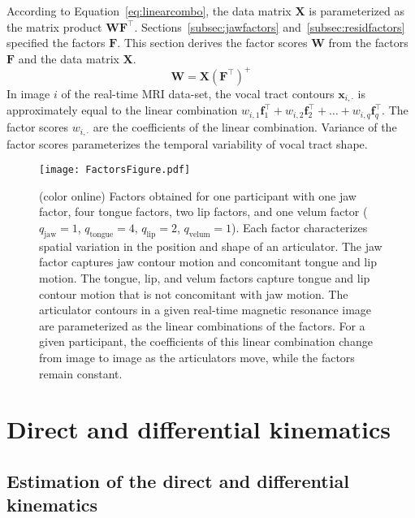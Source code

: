 \documentclass[preprint]{JASAnew}\usepackage[]{graphicx}\usepackage[]{color}
\begin{document}
According to Equation~\ref{eq:linearcombo}, the data matrix $\mathbf{X}$ is parameterized as the matrix product $\mathbf{W}\mathbf{F}^\intercal$. 
%
Sections~\ref{subsec:jawfactors} and~\ref{subsec:residfactors} specified the factors $\mathbf{F}$. 
%
This section derives the factor scores $\mathbf{W}$ from the factors $\mathbf{F}$ and the data matrix $\mathbf{X}$. 
%
\begin{equation}
\mathbf{W} 
 = \mathbf{X} \left( \mathbf{F}^\intercal \right) ^+
\end{equation}
%
In image $i$ of the real-time MRI data-set, the vocal tract contours $\mathbf{x}_{i,\cdot}$ is approximately equal to the linear combination $w_{i,1} \mathbf{f}_1^\intercal + w_{i,2} \mathbf{f}_2^\intercal + \ldots + w_{i,q} \mathbf{f}_q^\intercal$. The factor scores $w_{i,\cdot }$ are the coefficients of the linear combination. Variance of the factor scores parameterizes the temporal variability of vocal tract shape. 

\begin{figure}

\texttt{[image: FactorsFigure.pdf]}

\caption{(color online) Factors obtained for one participant with one jaw factor, four tongue factors, two lip factors, and one velum factor ($q_\text{jaw} = 1$, $q_\text{tongue} = 4$, $q_\text{lip} = 2$, $q_\text{velum} = 1$). 
Each factor characterizes spatial variation in the position and shape of an articulator. 
The jaw factor captures jaw contour motion and concomitant tongue and lip motion.
The tongue, lip, and velum factors capture tongue and lip contour motion that is not concomitant with jaw motion. 
The articulator contours in a given real-time magnetic resonance image are parameterized as the linear combinations of the factors. 
For a given participant, the coefficients of this linear combination change from image to image as the articulators move, while the factors remain constant.}
\label{fig:gfa}
\end{figure}







\section{Direct and differential kinematics}
\label{sec:forwardkinematicmap}

\subsection{Estimation of the direct and differential kinematics}
\end{document}

